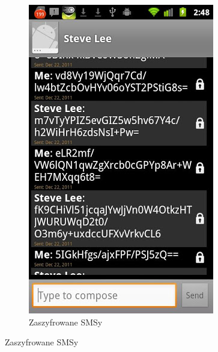 \documentclass[xcolor=table]{beamer}
\begin{document}
\begin{frame}
\begin{center}
\begin{figure}
\begin{subfigure}[b]{0.4\textwidth}
              \includegraphics[width=\textwidth]{uText2}
              \caption{Zaszyfrowane SMSy}
            \end{subfigure}       
        \end{figure}
      \end{center}
\end{frame}
\end{document}
